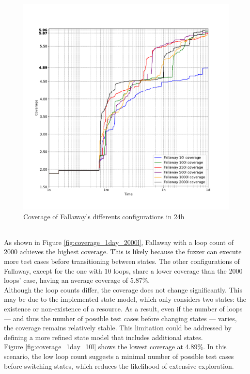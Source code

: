 \begin{figure}[H]
    \centering
    \includegraphics[width=1\textwidth]{Images/coverage_over_time_lighttpd-1day-fallaways.pdf}
    \caption{Coverage of Fallaway's differents configurations in 24h}
    \label{fig:coverage_1day_fallaways}
\end{figure}
\phantom{}\\
As shown in Figure \ref{fig:coverage_1day_2000l}, Fallaway with a loop count of 2000 achieves the highest coverage. This is likely because the fuzzer can execute more test cases before transitioning between states. The other configurations of Fallaway, except for the one with 10 loops, share a lower coverage than the 2000 loops' case, having an average coverage of 5.87\%.
\\Although the loop counts differ, the coverage does not change significantly. This may be due to the implemented state model, which only considers two states: the existence or non-existence of a resource. As a result, even if the number of loops — and thus the number of possible test cases before changing states — varies, the coverage remains relatively stable. This limitation could be addressed by defining a more refined state model that includes additional states.
\\Figure \ref{fig:coverage_1day_10l} shows the lowest coverage at 4.89\%. In this scenario, the low loop count suggests a minimal number of possible test cases before switching states, which reduces the likelihood of extensive exploration.
